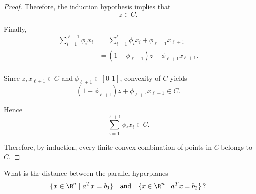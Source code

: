 \documentclass[12pt]{book}
\begin{document}
\begin{proof}
    Therefore, the induction hypothesis implies that
    \begin{equation*}
        z \in C.
    \end{equation*}

    Finally,
    \begin{equation*}
    \begin{aligned}
        \sum_{i=1}^{\ell+1}\phi_i x_i
        &=
        \sum_{i=1}^{\ell}\phi_i x_i
        + \phi_{\ell+1}x_{\ell+1} \\
        &=
        (1-\phi_{\ell+1})z
        + \phi_{\ell+1}x_{\ell+1}.
    \end{aligned}
    \end{equation*} \\

    Since $z,x_{\ell+1}\in C$ and
    $\phi_{\ell+1}\in[0,1]$, convexity of $C$ yields
    \begin{equation*}
        (1-\phi_{\ell+1})z
        + \phi_{\ell+1}x_{\ell+1}
        \in C.
    \end{equation*}

    Hence
    \begin{equation*}
        \sum_{i=1}^{\ell+1}\phi_i x_i
        \in C.
    \end{equation*}

    Therefore, by induction, every finite convex combination of points in $C$
    belongs to $C$.
\end{proof}


\newpage


\begin{exercise}
    What is the distance between the parallel hyperplanes
    \begin{align*}
        \{x \in \R^n \mid a^T x = b_1\}
        \quad \text{and} \quad
        \{x \in \R^n \mid a^T x = b_2\}\, ?
    \end{align*}
\end{exercise}
\end{document}
